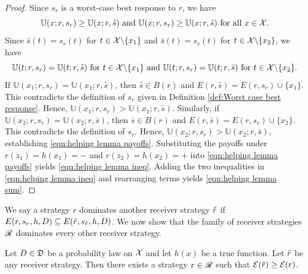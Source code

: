 \begin{proof}\label{proof:helping lemma}
    Since $s_{r}$ is a worst-case best response to $r$, we have $$\mathbb{U}(x; r, s_r) \geq \mathbb{U}(x; r, \hat{s}) \text{ and } \mathbb{U}(x; r, s_r) \geq \mathbb{U}(x; r, \bar{s}) \text{ for all } x \in \mathcal{X}.$$ Since $\hat{s}(t) = s_{r}(t)$ for $t \in \mathcal{X} \backslash  \{x_1\}$ and $\bar{s}(t) = s_{r}(t)$ for $t \in \mathcal{X} \backslash \{x_2\}$, we have
	\[\mathbb{U}(t; r, s_{r}) = \mathbb{U}(t; r, \hat{s}) \text{ for } t \in \mathcal{X} \backslash \{x_1\} \text{ and } \mathbb{U}(t; r, s_{r}) = \mathbb{U}(t; r, \bar{s}) \text{ for } t \in \mathcal{X} \backslash \{x_2\}.\]
	If $\mathbb{U}(x_1; r, s_r) = \mathbb{U}(x_1; r, \hat{s})$, then $\hat{s} \in B(r)$ and $E(r,\hat{s}) = E(r,s_r) \cup \{x_1\}$. This contradicts the definition of $s_r$ given in Definition \ref{def:Worst case best response}. Hence, $\mathbb{U}(x_1; r, s_{r}) > \mathbb{U}(x_1; r, \hat{s})$. Similarly, if $\mathbb{U}(x_2; r, s_{r}) = \mathbb{U}(x_2; r, \bar{s})$, then $\bar{s} \in B(r)$ and $E(r,\bar{s}) = E(r,s_r) \cup \{x_2\}$. This contradicts the definition of $s_r$. Hence, $\mathbb{U}(x_2; r, s_{r}) > \mathbb{U}(x_2; r, \bar{s})$, establishing \eqref{eqn:helping lemma payoffs}.
	Substituting the payoffs under $r(z_1) = h(x_1) = \minus$ and $r(z_2) = h(x_2) = \plus$ into \eqref{eqn:helping lemma payoffs} yields \eqref{eqn:helping lemma ineq}. Adding the two inequalities in \eqref{eqn:helping lemma ineq} and rearranging terms yields \eqref{eqn:helping lemma sum}.
\end{proof}

We say a strategy $r$ dominates another receiver strategy $\tilde{r}$ if $E(r,s_r,h,D) \subseteq E(\tilde{r},s_{\tilde{r}},h,D)$. We now show that the family of receiver strategies $\mathscr{R}$ dominates every other receiver strategy.

\begin{lem}\label{lem:Deterministic domination of a family of strategies}
	Let $D \in \mathfrak{D}$ be a probability law on $\mathcal{X}$ and let $h(x)$ be a true function. Let $\tilde{r}$ be any receiver strategy. Then there exists a strategy $r \in \mathscr{R}$ such that $\mathcal{E}(\tilde{r}) \geq \mathcal{E}(r)$.
\end{lem}


